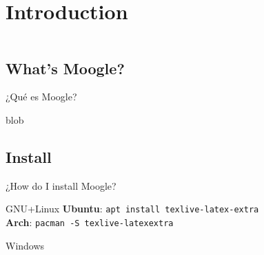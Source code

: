 \section{Introduction}\label{intro}

\begin{frame}
    \begin{columns}[t]
        \begin{column}{.5\textwidth}
          \tableofcontents[sections={1-2},currentsection]
        \end{column}
        \begin{column}{.5\textwidth}
          \tableofcontents[sections={3-4},currentsection]
        \end{column}
    \end{columns}
\end{frame}

\subsection{What's Moogle?}

\begin{frame}{¿Qué es Moogle?}
\begin{center}

\end{center}

\pause

blob

\end{frame}


\subsection{Install}

\begin{frame}{¿How do I install Moogle?}

\begin{block}{GNU+Linux}
  \textbf{Ubuntu}: \texttt{apt install texlive-latex-extra}\\
  \textbf{Arch}: \texttt{pacman -S texlive-latexextra}\\
\end{block}

\pause

\begin{block}{Windows}
\end{block}
\end{frame}
